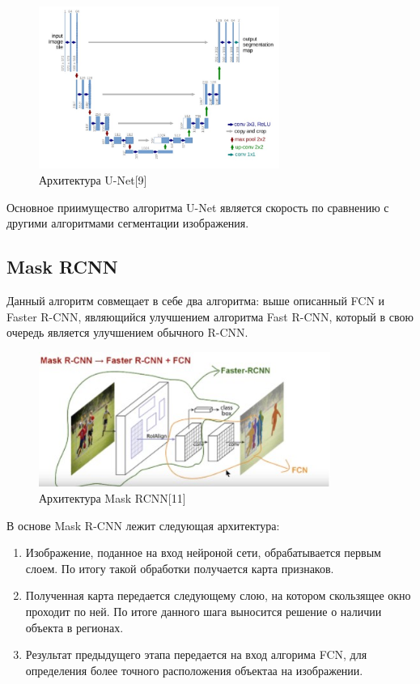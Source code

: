 \documentclass[bachelor, och, coursework]{shiza}
\begin{document}
\begin{figure}[H]
    \centering
    \includegraphics[width=0.7\textwidth]{8}
    \caption{Архитектура U-Net[9]}
    \label{fig:img1}
\end{figure}

Основное приимущество алгоритма U-Net является скорость по сравнению с другими алгоритмами сегментации изображения.

\subsection{Mask RCNN}

Данный алгоритм совмещает в себе два алгоритма: выше описанный FCN и Faster R-CNN, являющийся улучшением алгоритма Fast R-CNN, который в свою очередь 
является улучшением обычного R-CNN. 

\begin{figure}[H]
    \centering
    \includegraphics[width=0.85\textwidth]{10}
    \caption{Архитектура Mask RCNN[11]}
    \label{fig:img1}
\end{figure}

В основе Mask R-CNN лежит следующая архитектура:

\begin{enumerate}
    \item Изображение, поданное на вход нейроной сети, обрабатывается первым слоем. По итогу такой обработки получается карта признаков.
    \item Полученная карта передается следующему слою, на котором скользящее окно проходит по ней. По итоге данного шага выносится решение о наличии
    объекта в регионах.
    \item Результат предыдущего этапа передается на вход алгорима FCN, для определения более точного расположения объектаа на изображении.
\end{enumerate}
\end{document}
